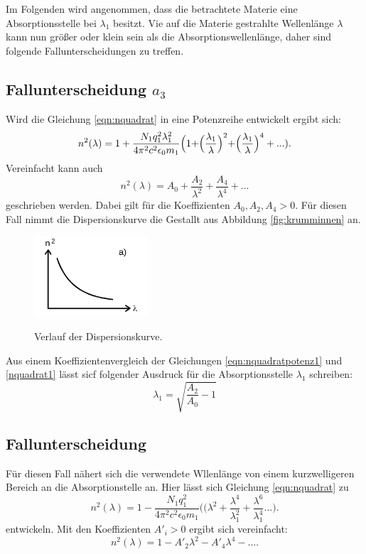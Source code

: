 Im Folgenden wird angenommen, dass die betrachtete Materie eine Absorptionsstelle
bei $\lambda_1$ besitzt. Vie auf die Materie gestrahlte Wellenlänge $\lambda$
kann nun größer oder klein sein als die Absorptionswellenlänge, daher sind
folgende Fallunterscheidungen zu treffen.

\subsection{Fallunterscheidung $a_3$} %
Wird die Gleichung \ref{eqn:nquadrat} in eine Potenzreihe entwickelt ergibt
sich:
\begin{equation}
  n^2(\lambda)=1+\frac{N_1 q^{2}_1 \lambda_{1}^{2}}{4\pi^2c^2\epsilon_0 m_1}
  \Bigr(1+\Bigr(\frac{\lambda_1}{\lambda}\Bigl)^2 +\Bigl(\frac{\lambda_1}{\lambda}\Bigr)^4+...).
  \label{nquadratpotenz1}
\end{equation}
Vereinfacht kann auch
\begin{equation}
 n^2(\lambda)= A_0+\frac{A_2}{\lambda^2}+\frac{A_4}{\lambda^4}+...
 \label{nquadrat1}
\end{equation}
geschrieben werden.
Dabei gilt für die Koeffizienten $A_0,A_2,A_4>0$.
Für diesen Fall nimmt die Dispersionskurve die Gestallt aus
Abbildung \ref{fig:krumminnen} an.

\begin{figure}[H]
  \centering
  \includegraphics[height=3cm]{n1.png}
  \caption{Verlauf der Dispersionskurve.}
  \label{fig:krummaußen}
  \cite{skript}
\end{figure}

Aus einem Koeffizientenvergleich der Gleichungen \ref{eqn:nquadratpotenz1}
und \ref{nquadrat1} lässt sicf folgender Ausdruck für die
Absorptionsstelle $\lambda_1$ schreiben:
\begin{equation}
  \lambda_1=\sqrt{\frac{A_2}{A_0}-1}
  \label{absorption}
\end{equation}

\subsection{Fallunterscheidung}%
Für diesen Fall nähert sich die verwendete Wllenlänge von einem kurzwelligeren
Bereich an die Absorptionstelle an. Hier lässt sich Gleichung
\ref{eqn:nquadrat} zu
\begin{equation}
  n^2(\lambda)=1-\frac{N_1 q^{2}_1}{4\pi^2c^2\epsilon_0 m_1}
  \Bigr(\Bigr(\lambda^2+\frac{\lambda^4}{\lambda^{2}_1}+\frac{\lambda^6}{\lambda^{4}_1}...).
  \label{nquadratpotenz2}
\end{equation}
entwickeln. Mit den Koeffizienten $A'_i>0$ ergibt sich vereinfacht:
\begin{equation}
  n^2(\lambda)=1-A'_2 \lambda^2 -A'_4 \lambda^4-....
  \label{nquadrat2}
\end{equation}

